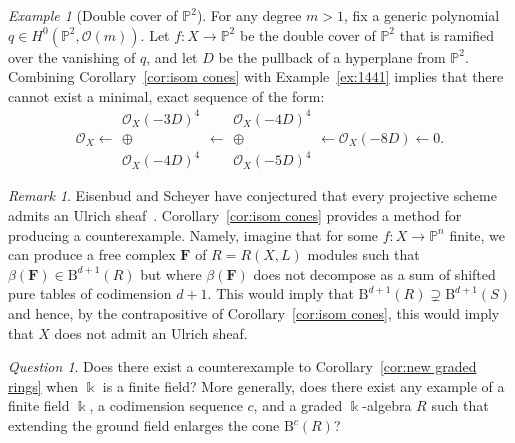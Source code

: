 \documentclass[12pt]{amsart}
\theoremstyle{definition}
\theoremstyle{remark}
\newtheorem{example}[lemma]{Example}
\newtheorem{remark}[lemma]{Remark}
\newtheorem{question}[lemma]{Question}
\newcommand{\kk}{\Bbbk}
\newcommand{\PP}{\mathbb{P}}
\newcommand{\bb}{c}
\newcommand{\cO}{\mathcal{O}}
\newcommand{\FF}{\mathbf{F}}
\newcommand{\BBQ}{\mathrm{B}}
\begin{document}
\begin{example}[Double cover of $\PP^2$]
For any degree $m>1$, fix a generic polynomial $q\in H^0(\PP^2, \cO(m))$.  Let $f\colon X\to\PP^2$ be the double cover of $\PP^2$ that is ramified over the vanishing of $q$, and let $D$ be the pullback of a hyperplane from $\PP^2$.  Combining Corollary~\ref{cor:isom cones} with Example~\ref{ex:1441} implies that there cannot exist a minimal, exact sequence of the form:
\[
\cO_X\longleftarrow \begin{matrix}  \cO_X(-3D)^4\\ \oplus\\ \cO_X(-4D)^4\end{matrix}\longleftarrow \begin{matrix}  \cO_X(-4D)^4\\ \oplus\\ \cO_X(-5D)^4\end{matrix} \longleftarrow \cO_X(-8D)\longleftarrow 0.
\]
\end{example}


\begin{remark}
Eisenbud and Scheyer have conjectured that every projective scheme admits an Ulrich sheaf~\cite[p. 543]{eis-schrey-chow}.  Corollary~\ref{cor:isom cones} provides a method for producing a counterexample.  Namely, imagine that for some $f\colon X\to \PP^n$ finite, we can produce a free complex $\FF$ of $R=R(X,L)$ modules such that $\beta(\FF)\in \BBQ^{d+1}(R)$ but where $\beta(\FF)$ does not decompose as a sum of shifted pure tables of codimension $d+1$.  This would imply that $\BBQ^{d+1}(R)\supsetneq \BBQ^{d+1}(S)$ and hence, by the contrapositive of Corollary~\ref{cor:isom cones}, this would imply that $X$ does not admit an Ulrich sheaf.
\end{remark}

\begin{question}
Does there exist a counterexample to Corollary~\ref{cor:new graded rings} when $\kk$ is a finite field?  
More generally, does there exist any example of a finite field $\kk$, a codimension sequence $\bb$, and a graded $\kk$-algebra $R$ such that extending the ground field enlarges the cone $\BBQ^{\bb}(R)$?
\end{question}

\end{document}
